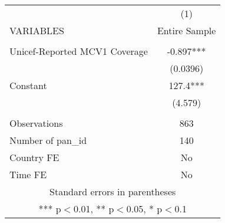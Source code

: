 \documentclass[]{article}
\begin{document}
\begin{tabular}{lc} \hline
 & (1) \\
VARIABLES & Entire Sample \\ \hline
 &  \\
Unicef-Reported MCV1 Coverage & -0.897*** \\
 & (0.0396) \\
Constant & 127.4*** \\
 & (4.579) \\
 &  \\
Observations & 863 \\
Number of pan\_id & 140 \\
Country FE & No \\
 Time FE & No \\ \hline
\multicolumn{2}{c}{ Standard errors in parentheses} \\
\multicolumn{2}{c}{ *** p$<$0.01, ** p$<$0.05, * p$<$0.1} \\
\end{tabular}
\end{document}

